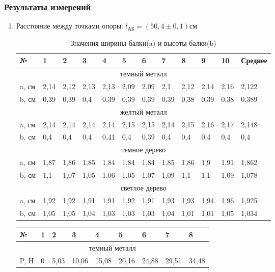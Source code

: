 \documentclass[a4paper,14pt]{extarticle}
\begin{document}
\subsubsection{Результаты измерений}
\begin{enumerate}
	\item Расстояние между точками опоры: $l_\text{АБ} = (50,4 \pm 0,1)\text{см}$
 \begin{table}[!ht]
	\centering
	\begin{tabular}{|l|l|l|l|l|l|l|l|l|l|l|l|}
		\hline
		№ & 1 & 2 & 3 & 4 & 5 & 6 & 7 & 8 & 9 & 10 & Среднее \\ \hline
		\multicolumn{12}{|c|}{темный металл} \\ \hline
		a, см & 2,14 & 2,12 & 2,13 & 2,13 & 2,09 & 2,09 & 2,1 & 2,12 & 2,14 & 2,16 & 2,122 \\ \hline
		b, см & 0,39 & 0,39 & 0,4 & 0,39 & 0,39 & 0,39 & 0,39 & 0,38 & 0,39 & 0,38 & 0,389 \\ \hline
		\multicolumn{12}{|c|}{желтый металл} \\ \hline
		a, см & 2,14 & 2,14 & 2,14 & 2,14 & 2,15 & 2,15 & 2,14 & 2,15 & 2,16 & 2,17 & 2,148 \\ \hline
		b, см & 0,4 & 0,4 & 0,4 & 0,41 & 0,4 & 0,39 & 0,4 & 0,4 & 0,4 & 0,4 & 0,4 \\ \hline
		\multicolumn{12}{|c|}{темное дерево} \\ \hline
		a, см & 1,87 & 1,86 & 1,85 & 1,84 & 1,84 & 1,84 & 1,85 & 1,86 & 1,9 & 1,91 & 1,862 \\ \hline
		b, см & 1,1 & 1,07 & 1,05 & 1,06 & 1,05 & 1,07 & 1,09 & 1,1 & 1,1 & 1,09 & 1,078 \\ \hline
		\multicolumn{12}{|c|}{светлое дерево} \\ \hline
		a, см & 1,92 & 1,92 & 1,91 & 1,91 & 1,92 & 1,91 & 1,93 & 1,93 & 1,94 & 1,96 & 1,925 \\ \hline
		b, см & 1,05 & 1,05 & 1,04 & 1,03 & 1,03 & 1,03 & 1,04 & 1,01 & 1,01 & 1,05 & 1,034 \\ \hline
	\end{tabular}
	\caption{Значения ширины балки(a) и высоты балки(b)}
\end{table}
\begin{table}[!ht]
	\centering
	\begin{tabular}{|l|l|l|l|l|l|l|l|l|}
		\hline
		№ & 1 & 2 & 3 & 4 & 5 & 6 & 7 & 8 \\ \hline
		\multicolumn{9}{|c|}{темный металл} \\ \hline
		P, H & 0 & 5,03 & 10,06 & 15,08 & 20,16 & 24,88 & 29,51 & 34,48 \\ \hline

\end{tabular}
\end{table}
\end{enumerate}
\end{document}
